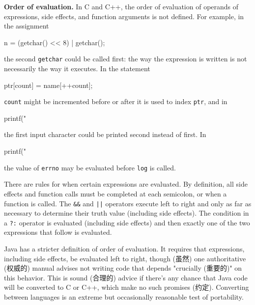 \textbf{Order of evaluation.} In C and C++, the order of evaluation of
operands of expressions, side effects, and function arguments is not
defined. For example, in the assignment
\begin{badcode}
    n = (getchar() << 8) | getchar();
\end{badcode}
the second \verb'getchar' could be called first: the way the expression is
written is not necessarily the way it executes. In the statement
\begin{badcode}
    ptr[count] = name[++count];
\end{badcode}
\verb'count' might be incremented before or after it is used to index
\verb'ptr', and in
\begin{badcode}
    printf("%
\end{badcode}
the first input character could be printed second instead of first. In
\begin{badcode}
    printf("%
\end{badcode}
the value of \verb'errno' may be evaluated before \verb'log' is called.

There are rules for when certain expressions are evaluated. By definition,
all side effects and function calls must be completed at each semicolon, or
when a function is called. The \verb'&&' and \verb'||' operators execute
left to right and only as far as necessary to determine their truth value
(including side effects). The condition in a \verb'?:' operator is
evaluated (including side effects) and then exactly one of the two
expressions that follow is evaluated.

Java has a stricter definition of order of evaluation. It requires that
expressions, including side effects, be evaluated left to right, though
(虽然) one authoritative (权威的) manual advises not writing code that
depends "crucially (重要的)" on this behavior. This is sound (合理的)
advice if there's any chance that Java code will be converted to C or C++,
which make no such promises (约定). Converting between languages is an
extreme but occasionally reasonable test of portability.


